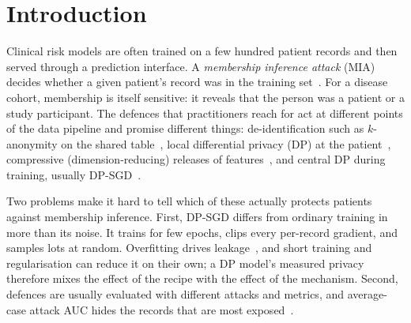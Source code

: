 \documentclass[conference]{IEEEtran}
\begin{document}
\section{Introduction}
Clinical risk models are often trained on a few hundred patient records and then served through a prediction interface. A \emph{membership inference attack} (MIA) decides whether a given patient's record was in the training set~\cite{shokri2017,yeom2018}. For a disease cohort, membership is itself sensitive: it reveals that the person was a patient or a study participant. The defences that practitioners reach for act at different points of the data pipeline and promise different things: de-identification such as $k$-anonymity on the shared table~\cite{sweeney2002,lefevre2006}, local differential privacy (DP) at the patient~\cite{warner1965,kasiviswanathan2011}, compressive (dimension-reducing) releases of features~\cite{kung2017spm}, and central DP during training, usually DP-SGD~\cite{abadi2016,dwork2014}.

Two problems make it hard to tell which of these actually protects patients against membership inference. First, DP-SGD differs from ordinary training in more than its noise. It trains for few epochs, clips every per-record gradient, and samples lots at random. Overfitting drives leakage~\cite{yeom2018,shokri2017}, and short training and regularisation can reduce it on their own; a DP model's measured privacy therefore mixes the effect of the recipe with the effect of the mechanism. Second, defences are usually evaluated with different attacks and metrics, and average-case attack AUC hides the records that are most exposed~\cite{carlini2022,aerni2024}.
\end{document}
